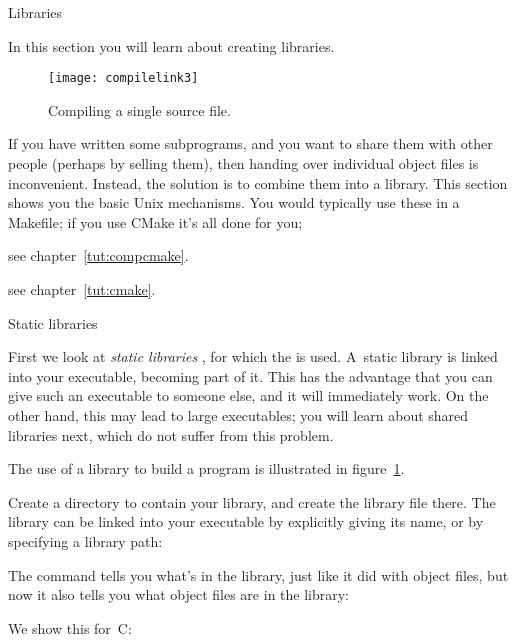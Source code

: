  {Libraries}

\begin{purpose}
  In this section you will learn about creating libraries.
\end{purpose}


\begin{figure}[ht]
  \texttt{[image: compilelink3]}
  \caption{Compiling a single source file.}
  \label{fig:compilelink3}
\end{figure}

If you have written some subprograms, and you want to share them with
other people (perhaps by selling them), then handing over individual
object files is inconvenient. Instead, the solution is to combine them
into a library.
This section shows you the basic Unix mechanisms.
You would typically use these in a Makefile;
if you use CMake it's all done for you;
\begin{packt}
  see chapter~\ref{tut:compcmake}.
\end{packt}
\begin{nopackt}
  see chapter~\ref{tut:cmake}.
\end{nopackt}

 {Static libraries}

First we look at
\emph{static libraries}%
,
for
which the   is used.
A~static library
is linked into your executable, becoming part of it.
This has the advantage that you can give such an executable to someone else,
and it will immediately work.
On the other hand, this may lead to large executables;
you will learn about shared libraries
next, which do not suffer from this problem.

The use of a library to build a program is illustrated
in figure~\ref{fig:compilelink3}.

Create a directory to contain your library, and create the library file
there. 
The library can be linked into your executable by explicitly giving
its name, or by specifying a library path:


The  command tells you what's in the library, just
like it did with object files, but now it also tells you what object
files are in the library:

We show this for~C:
%
\begingroup \def\codefraction{.4}\def\outputfraction{.55} %
\endgroup 

